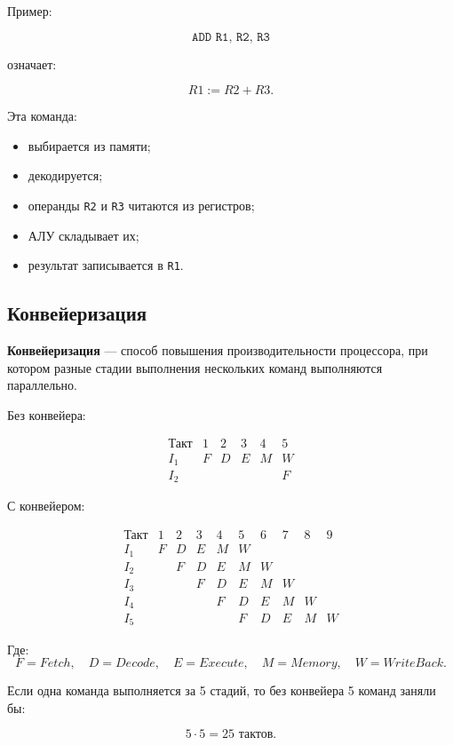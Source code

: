 \documentclass[12pt,a4paper]{article}
\theoremstyle{remark}
\begin{document}
Пример:

\[
\texttt{ADD R1, R2, R3}
\]

означает:

\[
R1 := R2 + R3.
\]

Эта команда:
\begin{itemize}
    \item выбирается из памяти;
    \item декодируется;
    \item операнды \texttt{R2} и \texttt{R3} читаются из регистров;
    \item АЛУ складывает их;
    \item результат записывается в \texttt{R1}.
\end{itemize}

\subsection{Конвейеризация}

\textbf{Конвейеризация} --- способ повышения производительности процессора, при котором разные стадии выполнения нескольких команд выполняются параллельно.

Без конвейера:

\[
\begin{array}{c|ccccc}
\text{Такт} & 1 & 2 & 3 & 4 & 5 \\ \hline
I_1 & F & D & E & M & W \\
I_2 &  &  &  &  & F
\end{array}
\]

С конвейером:

\[
\begin{array}{c|ccccccccc}
\text{Такт} & 1 & 2 & 3 & 4 & 5 & 6 & 7 & 8 & 9 \\ \hline
I_1 & F & D & E & M & W & & & & \\
I_2 &   & F & D & E & M & W & & & \\
I_3 &   &   & F & D & E & M & W & & \\
I_4 &   &   &   & F & D & E & M & W & \\
I_5 &   &   &   &   & F & D & E & M & W
\end{array}
\]

Где:
\[
F = Fetch,\quad D = Decode,\quad E = Execute,\quad M = Memory,\quad W = WriteBack.
\]

Если одна команда выполняется за 5 стадий, то без конвейера 5 команд заняли бы:

\[
5 \cdot 5 = 25 \text{ тактов}.
\]
\end{document}
